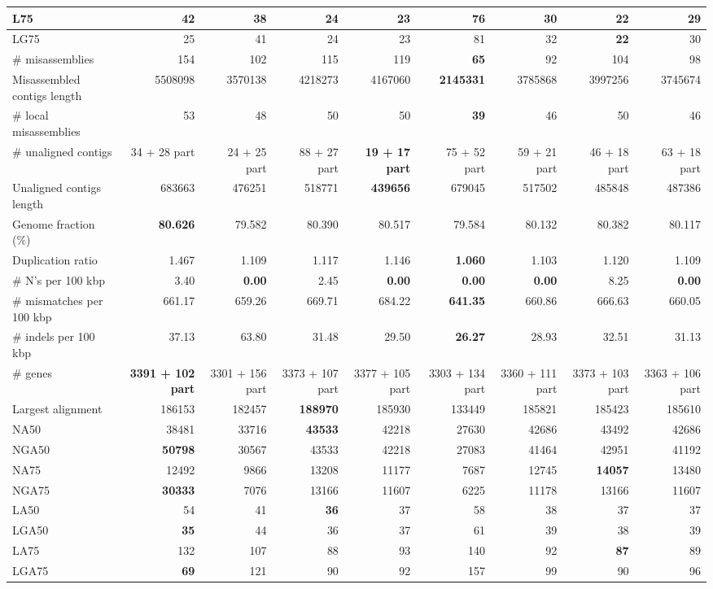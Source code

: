 \documentclass[12pt,a4paper]{article}
\begin{document}
\begin{table}[ht]
\begin{center}
\begin{tabular}{|l*{8}{|r}|}
L75 & 42 & 38 & 24 & 23 & 76 & 30 & {\bf 22} & 29 \\ \hline
LG75 & 25 & 41 & 24 & 23 & 81 & 32 & {\bf 22} & 30 \\ \hline
\# misassemblies & 154 & 102 & 115 & 119 & {\bf 65} & 92 & 104 & 98 \\ \hline
Misassembled contigs length & 5508098 & 3570138 & 4218273 & 4167060 & {\bf 2145331} & 3785868 & 3997256 & 3745674 \\ \hline
\# local misassemblies & 53 & 48 & 50 & 50 & {\bf 39} & 46 & 50 & 46 \\ \hline
\# unaligned contigs & 34 + 28 part & 24 + 25 part & 88 + 27 part & {\bf 19 + 17 part} & 75 + 52 part & 59 + 21 part & 46 + 18 part & 63 + 18 part \\ \hline
Unaligned contigs length & 683663 & 476251 & 518771 & {\bf 439656} & 679045 & 517502 & 485848 & 487386 \\ \hline
Genome fraction (\%) & {\bf 80.626} & 79.582 & 80.390 & 80.517 & 79.584 & 80.132 & 80.382 & 80.117 \\ \hline
Duplication ratio & 1.467 & 1.109 & 1.117 & 1.146 & {\bf 1.060} & 1.103 & 1.120 & 1.109 \\ \hline
\# N's per 100 kbp & 3.40 & {\bf 0.00} & 2.45 & {\bf 0.00} & {\bf 0.00} & {\bf 0.00} & 8.25 & {\bf 0.00} \\ \hline
\# mismatches per 100 kbp & 661.17 & 659.26 & 669.71 & 684.22 & {\bf 641.35} & 660.86 & 666.63 & 660.05 \\ \hline
\# indels per 100 kbp & 37.13 & 63.80 & 31.48 & 29.50 & {\bf 26.27} & 28.93 & 32.51 & 31.13 \\ \hline
\# genes & {\bf 3391 + 102 part} & 3301 + 156 part & 3373 + 107 part & 3377 + 105 part & 3303 + 134 part & 3360 + 111 part & 3373 + 103 part & 3363 + 106 part \\ \hline
Largest alignment & 186153 & 182457 & {\bf 188970} & 185930 & 133449 & 185821 & 185423 & 185610 \\ \hline
NA50 & 38481 & 33716 & {\bf 43533} & 42218 & 27630 & 42686 & 43492 & 42686 \\ \hline
NGA50 & {\bf 50798} & 30567 & 43533 & 42218 & 27083 & 41464 & 42951 & 41192 \\ \hline
NA75 & 12492 & 9866 & 13208 & 11177 & 7687 & 12745 & {\bf 14057} & 13480 \\ \hline
NGA75 & {\bf 30333} & 7076 & 13166 & 11607 & 6225 & 11178 & 13166 & 11607 \\ \hline
LA50 & 54 & 41 & {\bf 36} & 37 & 58 & 38 & 37 & 37 \\ \hline
LGA50 & {\bf 35} & 44 & 36 & 37 & 61 & 39 & 38 & 39 \\ \hline
LA75 & 132 & 107 & 88 & 93 & 140 & 92 & {\bf 87} & 89 \\ \hline
LGA75 & {\bf 69} & 121 & 90 & 92 & 157 & 99 & 90 & 96 \\ \hline
\end{tabular}
\end{center}
\end{table}
\end{document}
